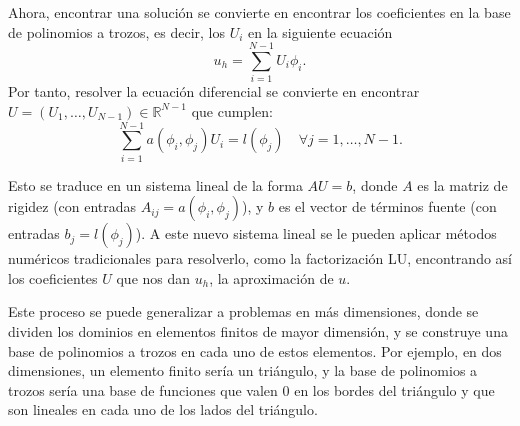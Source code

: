 \documentclass[a4paper,11pt,spanish, twoside, leqno]{tfg-uam}
\theoremstyle{definition}
\begin{document}
Ahora, encontrar una solución se convierte en encontrar los coeficientes en la base de polinomios a trozos, es decir, los $U_i$ en la siguiente ecuación
\begin{equation}
    u_h = \sum_{i=1}^{N-1} U_i\phi_i.
\end{equation}
Por tanto, resolver la ecuación diferencial se convierte en encontrar $U=(U_1,\dots, U_{N-1}) \in \mathbb{R}^{N-1}$ que cumplen:
\begin{equation}
    \sum_{i=1}^{N-1} a\left( \phi_i,\phi_j\right)U_i = l(\phi_j) \quad \forall j = 1,\dots,N-1.
\end{equation}

Esto se traduce en un sistema lineal de la forma $AU = b$, donde $A$ es la matriz de rigidez (con entradas $A_{ij}=a\left( \phi_i,\phi_j\right)$), y $b$ es el vector de términos fuente (con entradas $b_j = l(\phi_j)$). A este nuevo sistema lineal se le pueden aplicar métodos numéricos tradicionales para resolverlo, como la factorización LU, encontrando así los coeficientes $U$ que nos dan $u_h$, la aproximación de $u$.

Este proceso se puede generalizar a problemas en más dimensiones, donde se dividen los dominios en elementos finitos de mayor dimensión, y se construye una base de polinomios a trozos en cada uno de estos elementos. Por ejemplo, en dos dimensiones, un elemento finito sería un triángulo, y la base de polinomios a trozos sería una base de funciones que valen $0$ en los bordes del triángulo y que son lineales en cada uno de los lados del triángulo.
\end{document}
